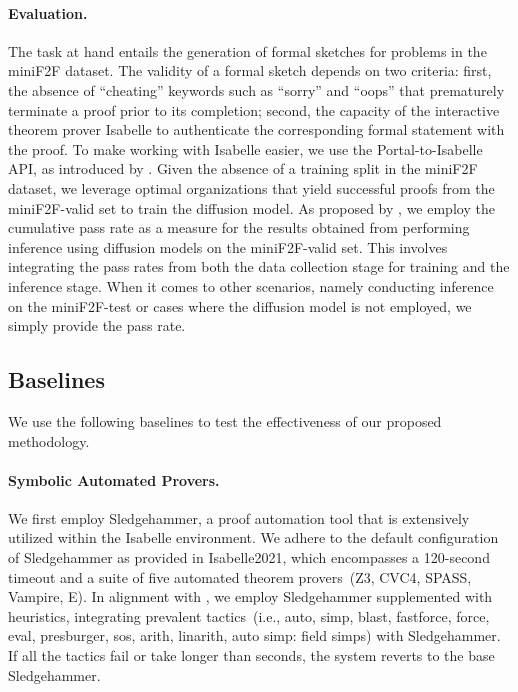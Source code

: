 \documentclass{article}
\begin{document}
\paragraph{Evaluation.}
The task at hand entails the generation of formal sketches for problems in the miniF2F dataset. The validity of a formal sketch depends on two criteria: first, the absence of ``cheating'' keywords such as ``sorry'' and ``oops'' that prematurely terminate a proof prior to its completion; second, the capacity of the interactive theorem prover Isabelle to authenticate the corresponding formal statement with the proof. To make working with Isabelle easier, we use the Portal-to-Isabelle API, as introduced by \citet{jiang2022draft}. 
Given the absence of a training split in the miniF2F dataset, we leverage optimal organizations that yield successful proofs from the miniF2F-valid set to train the diffusion model. As proposed by \citet{lample2022hypertree}, we employ the cumulative pass rate as a measure for the results obtained from performing inference using diffusion models on the miniF2F-valid set. This involves integrating the pass rates from both the data collection stage for training and the inference stage.  When it comes to other scenarios, namely conducting inference on the miniF2F-test or cases where the diffusion model is not employed, we simply provide the pass rate.

\subsection{Baselines}
We use the following baselines to test the effectiveness of our proposed methodology.

\paragraph{Symbolic Automated Provers.}
We first employ Sledgehammer, a proof automation tool that is extensively utilized within the Isabelle environment. We adhere to the default configuration of Sledgehammer as provided in Isabelle2021, which encompasses a 120-second timeout and a suite of five automated theorem provers~(Z3, CVC4, SPASS, Vampire, E). In alignment with \citet{jiang2022draft}, we employ Sledgehammer supplemented with heuristics, integrating  prevalent tactics~(i.e., auto, simp, blast, fastforce, force, eval, presburger, sos, arith, linarith, auto simp: field simps) with Sledgehammer.  If all the tactics fail or take longer than  seconds, the system reverts to the base Sledgehammer.
\end{document}
